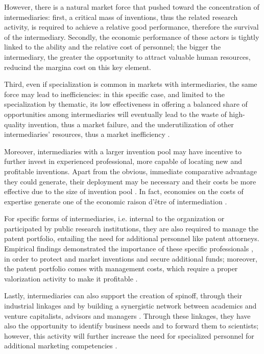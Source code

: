 However, there is a natural market force that pushed toward the concentration of intermediaries: first, a critical mass of inventions, thus the related research activity, is required to achieve a relative good performance, therefore the survival of the intermediary. Secondly, the economic performance of these actors is tightly linked to the ability and the relative cost of personnel; the bigger the intermediary, the greater the opportunity to attract valuable human resources, reducind the margina cost on this key element.

Third, even if specialization is common in markets with intermediaries, the same force may lead to inefficiencies: in this specific case, and limited to the specialization by thematic, its low effectiveness in offering a balanced share of opportunities among intermediaries will eventually lead to the waste of high-quality invention, thus a market failure, and the underutilization of other intermediaries' resources, thus a market inefficiency \citep{Hoppe2005}.

Moreover, intermediaries with a larger invention pool may have incentive to further invest in experienced professional, more capable of locating new and profitable inventions. Apart from the obvious, immediate comparative advantage they could generate, their deployment may be necessary and their costs be more effective due to the size of invention pool \citep{Debackere2005}. In fact, economies on the costs of expertise generate one of the economic raison d'être of intermediation \citep{Hoppe2005}.

For specific forms of intermediaries, i.e. internal to the organization or participated by public research institutions, they are also required to manage the patent portfolio, entailing the need for additional personnel like patent attorneys. Empirical findings demonstrated the importance of these specific professionals \citep{Siegel2003a}, in order to protect and market inventions and secure additional funds; moreover, the patent portfolio comes with management costs, which require a proper valorization activity to make it profitable \citep{Balderi2010}.

Lastly, intermediaries can also support the creation of spinoff, through their industrial linkages and by building a synergistic network between academics and venture capitalists, advisors and managers \citep{OShea2004}. Through these linkages, they have also the opportunity to identify business needs and to forward them to scientists; however, this activity will further increase the need for specialized personnel for additional marketing competencies \citep{Geuna2009,Muscio2008}. 

